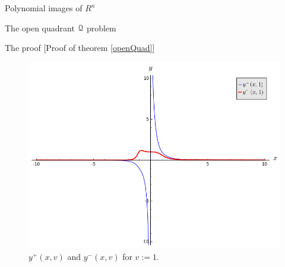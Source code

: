 \documentclass[11pt, a4paper, english, twoside, notitlepage, openright]{report}
\begin{document}
\begin{chapter}{Polynomial images of $R^n$}
\begin{section}{The open quadrant $\mathcal{Q}$ problem}
\begin{subsection}{The proof} [Proof of theorem \ref{openQuad}]
\begin{figure}[h]
\includegraphics[width=1\textwidth]{plots/ch1_07_sols_1.png}
\caption{$y^+(x,v)$ and $y^-(x,v)$ for $v:=1$.\label{fig:plotYs_2}}
\end{figure}


\end{subsection}
\end{section}
\end{chapter}
\end{document}
